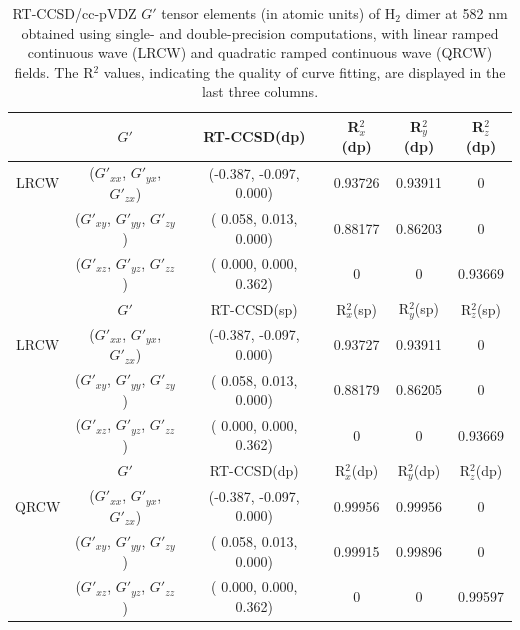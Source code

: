 \begin{table}
  \centering
    \caption{RT-CCSD/cc-pVDZ $G'$ tensor elements (in atomic units) of H$_{2}$ dimer at 582 nm obtained using single- and double-precision computations, with linear ramped continuous wave (LRCW) and quadratic ramped continuous wave (QRCW) fields. The R$^{2}$ values, indicating the quality of curve fitting, are displayed in the last three columns.}
  \begin{tabular}{c|c|c|ccc}
                                          &  $G'$ & \textrm{RT-CCSD(dp)} & R$^{2}_{x}$(dp) & R$^{2}_{y}$(dp)& R$^{2}_{z}$(dp)\\
                                          \hline
                \textrm{LRCW} & ($G'_{xx}$, $G'_{yx}$, $G'_{zx}$) & (-0.387, -0.097, 0.000) &   0.93726 & 0.93911 & 0 \\
                                          & ($G'_{xy}$, $G'_{yy}$, $G'_{zy}$) & ( 0.058,  0.013, 0.000) &   0.88177 & 0.86203 & 0 \\
                                          & ($G'_{xz}$, $G'_{yz}$, $G'_{zz}$) & ( 0.000,  0.000, 0.362) &   0 & 0 & 0.93669 \\   
                \hline
                                           &  $G'$ & \textrm{RT-CCSD(sp)} & R$^{2}_{x}$(sp) & R$^{2}_{y}$(sp)& R$^{2}_{z}$(sp)\\
                                          \hline
                \textrm{LRCW} & ($G'_{xx}$, $G'_{yx}$, $G'_{zx}$) & (-0.387, -0.097, 0.000) &   0.93727 & 0.93911 & 0 \\
                                          & ($G'_{xy}$, $G'_{yy}$, $G'_{zy}$) & ( 0.058,  0.013, 0.000) &   0.88179 & 0.86205 & 0 \\
                                          & ($G'_{xz}$, $G'_{yz}$, $G'_{zz}$) & ( 0.000,  0.000, 0.362) &   0 & 0 & 0.93669 \\  
                 \hline
                                            &  $G'$ & \textrm{RT-CCSD(dp)} & R$^{2}_{x}$(dp) & R$^{2}_{y}$(dp)& R$^{2}_{z}$(dp)\\
                                          \hline
                \textrm{QRCW} & ($G'_{xx}$, $G'_{yx}$, $G'_{zx}$) & (-0.387, -0.097, 0.000) &   0.99956 & 0.99956 & 0 \\
                                          & ($G'_{xy}$, $G'_{yy}$, $G'_{zy}$) & ( 0.058,  0.013, 0.000) &   0.99915 & 0.99896 & 0 \\
                                          & ($G'_{xz}$, $G'_{yz}$, $G'_{zz}$) & ( 0.000,  0.000, 0.362) &   0 & 0 & 0.99597 \\  

\end{tabular}
\end{table}
